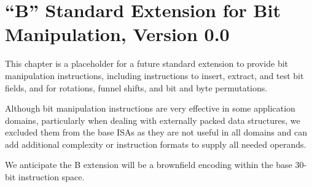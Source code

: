 \chapter{``B'' Standard Extension for Bit Manipulation, Version 0.0}
\label{sec:bits}

This chapter is a placeholder for a future standard extension to
provide bit manipulation instructions, including instructions to
insert, extract, and test bit fields, and for rotations, funnel
shifts, and bit and byte permutations.

\begin{commentary}
Although bit manipulation instructions are very effective in some
application domains, particularly when dealing with externally packed
data structures, we excluded them from the base ISAs as they are not
useful in all domains and can add additional complexity or instruction
formats to supply all needed operands.

We anticipate the B extension will be a brownfield encoding within the
base 30-bit instruction space.
\end{commentary}

